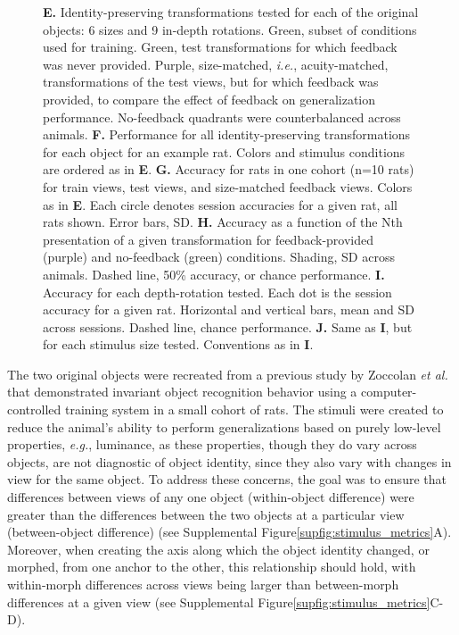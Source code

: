 \begin{figure}[t!]
{    \textbf{E.} Identity-preserving transformations tested for each of the original objects: 6 sizes and 9 in-depth rotations. Green, subset of conditions used for training. Green, test transformations for which feedback was never provided. Purple, size-matched, \textit{i.e.}, acuity-matched, transformations of the test views, but for which feedback was provided, to compare the effect of feedback on generalization performance. No-feedback quadrants were counterbalanced across animals. 
    \textbf{F.} Performance for all identity-preserving transformations for each object for an example rat. Colors and stimulus conditions are ordered as in \textbf{E}. \textbf{G.} Accuracy for rats in one cohort (n=10 rats) for train views, test views, and size-matched feedback views. Colors as in \textbf{E}. Each circle denotes session accuracies for a given rat, all rats shown. Error bars, SD.
    \textbf{H.} Accuracy as a function of the Nth presentation of a given transformation for feedback-provided (purple) and no-feedback (green) conditions. Shading, SD across animals. Dashed line, 50\% accuracy, or chance performance.
    \textbf{I.} Accuracy for each depth-rotation tested. Each dot is the session accuracy for a given rat. Horizontal and vertical bars, mean and SD across sessions. Dashed line, chance performance.
    \textbf{J.} Same as \textbf{I}, but for each stimulus size tested. Conventions as in \textbf{I}.
    \label{fig:behavior_generalization}}
\end{figure}

The two original objects were recreated from a previous study by Zoccolan \textit{et al.}\cite{Zoccolan2009} that demonstrated invariant object recognition behavior using a computer-controlled training system in a small cohort of rats. The stimuli were created to reduce the animal's ability to perform generalizations based on purely low-level properties, \textit{e.g.}, luminance, as these properties, though they do vary across objects, are not diagnostic of object identity, since they also vary with changes in view for the same object. To address these concerns, the goal was to ensure that differences between views of any one object (within-object difference) were greater than the differences between the two objects at a particular view (between-object difference) (see Supplemental Figure\ref{supfig:stimulus_metrics}A). Moreover, when creating the axis along which the object identity changed, or morphed, from one anchor to the other, this relationship should hold, with within-morph differences across views being larger than between-morph differences at a given view (see Supplemental Figure\ref{supfig:stimulus_metrics}C-D).

